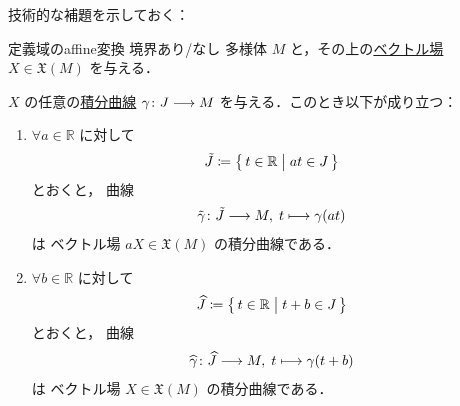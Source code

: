 \documentclass[geometry_main]{subfiles}
\begin{document}
技術的な補題を示しておく：

\begin{mylem}[label=lem:affine-integral-curve]{定義域のaffine変換}
    境界あり/なし \cinfty 多様体 $M$ と，その上の\hyperref[def:vecf]{\cinfty ベクトル場} $X \in \mathfrak{X}(M)$ を与える．

    $X$ の任意の\hyperref[def:integral-curve]{積分曲線} $\gamma \colon J \longrightarrow M$ を与える．このとき以下が成り立つ：
    \begin{enumerate}
        \item $\forall a \in \mathbb{R}$ に対して
        \begin{align}
            \tilde{J} \coloneqq \bigl\{\, t \in \mathbb{R} \bigm| at \in J \,\bigr\} 
        \end{align}
        とおくと，
        \cinfty 曲線
        \begin{align}
            \tilde{\gamma} \colon \tilde{J} \longrightarrow M,\; t \longmapsto \gamma(at)
        \end{align}
        は \cinfty ベクトル場 $a X \in \mathfrak{X} (M)$ の積分曲線である．
        \item  $\forall b \in \mathbb{R}$ に対して
        \begin{align}
            \widehat{J} \coloneqq \bigl\{\, t \in \mathbb{R} \bigm| t + b \in J \,\bigr\} 
        \end{align}
        とおくと，
        \cinfty 曲線
        \begin{align}
            \widehat{\gamma} \colon \widehat{J} \longrightarrow M,\; t \longmapsto \gamma(t + b)
        \end{align}
        は \cinfty ベクトル場 $X \in \mathfrak{X} (M)$ の積分曲線である．
    \end{enumerate}
\end{mylem}
\end{document}

